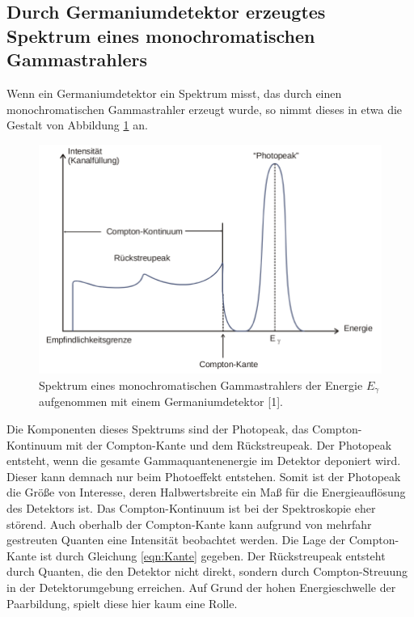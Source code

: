 \subsection{Durch Germaniumdetektor erzeugtes Spektrum eines monochromatischen Gammastrahlers}

Wenn ein Germaniumdetektor ein Spektrum misst, das durch einen monochromatischen Gammastrahler erzeugt wurde, so nimmt dieses in etwa die Gestalt von 
Abbildung \ref{fig:spektrum} an. 

\begin{figure}
    \centering
    \includegraphics[scale=0.3]{content/spektrum.png}
    \caption{Spektrum eines monochromatischen Gammastrahlers der Energie $E_\gamma$ aufgenommen mit einem Germaniumdetektor [1].}
    \label{fig:spektrum}
\end{figure}

Die Komponenten dieses Spektrums sind der Photopeak, das Compton-Kontinuum mit der Compton-Kante und dem Rückstreupeak. Der Photopeak entsteht, 
wenn die gesamte Gammaquantenenergie im Detektor deponiert wird. Dieser kann demnach nur beim Photoeffekt entstehen. Somit ist der Photopeak die 
Größe von Interesse, deren Halbwertsbreite ein Maß für die Energieauflösung des Detektors ist. Das Compton-Kontinuum ist bei der Spektroskopie
eher störend. Auch oberhalb der Compton-Kante kann aufgrund von mehrfahr gestreuten Quanten eine Intensität beobachtet werden. Die Lage der 
Compton-Kante ist durch Gleichung \eqref{eqn:Kante} gegeben. Der Rückstreupeak entsteht durch Quanten, die den Detektor nicht direkt, sondern
durch Compton-Streuung in der Detektorumgebung erreichen. Auf Grund der hohen Energieschwelle der Paarbildung, spielt diese hier kaum eine 
Rolle. 
